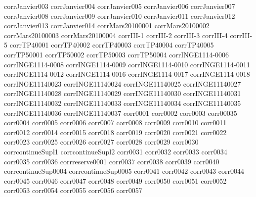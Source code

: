 {corrJanvier003}
{corrJanvier004}
{corrJanvier005}
{corrJanvier006}
{corrJanvier007}
{corrJanvier008}
{corrJanvier009}
{corrJanvier010}
{corrJanvier011}
{corrJanvier012}
{corrJanvier013}
{corrJanvier014}
{corrMars20100001}
{corrMars20100002}
{corrMars20100003}
{corrMars20100004}
{corrIII-1}
{corrIII-2}
{corrIII-3}
{corrIII-4}
{corrIII-5}
{corrTP40001}
{corrTP40002}
{corrTP40003}
{corrTP40004}
{corrTP40005}
{corrTP50001}
{corrTP50002}
{corrTP50003}
{corrTP50004}
{corrINGE1114-0006}
{corrINGE1114-0008}
{corrINGE1114-0009}
{corrINGE1114-0010}
{corrINGE1114-0011}
{corrINGE1114-0012}
{corrINGE1114-0016}
{corrINGE1114-0017}
{corrINGE1114-0018}
{corrINGE11140023}
{corrINGE11140024}
{corrINGE11140025}
{corrINGE11140027}
{corrINGE11140028}
{corrINGE11140029}
{corrINGE11140030}
{corrINGE11140031}
{corrINGE11140032}
{corrINGE11140033}
{corrINGE11140034}
{corrINGE11140035}
{corrINGE11140036}
{corrINGE11140037}
{corr0001}
{corr0002}
{corr0003}
{corr00035}
{corr0004}
{corr0005}
{corr0006}
{corr0007}
{corr0008}
{corr0009}
{corr0010}
{corr0011}
{corr0012}
{corr0014}
{corr0015}
{corr0018}
{corr0019}
{corr0020}
{corr0021}
{corr0022}
{corr0023}
{corr0025}
{corr0026}
{corr0027}
{corr0028}
{corr0029}
{corr0030}
{corrcontinueSupl1}
{corrcontinueSupl2}
{corr0031}
{corr0032}
{corr0033}
{corr0034}
{corr0035}
{corr0036}
{corrreserve0001}
{corr0037}
{corr0038}
{corr0039}
{corr0040}
{corrcontinueSup0004}
{corrcontinueSup0005}
{corr0041}
{corr0042}
{corr0043}
{corr0044}
{corr0045}
{corr0046}
{corr0047}
{corr0048}
{corr0049}
{corr0050}
{corr0051}
{corr0052}
{corr0053}
{corr0054}
{corr0055}
{corr0056}
{corr0057}

